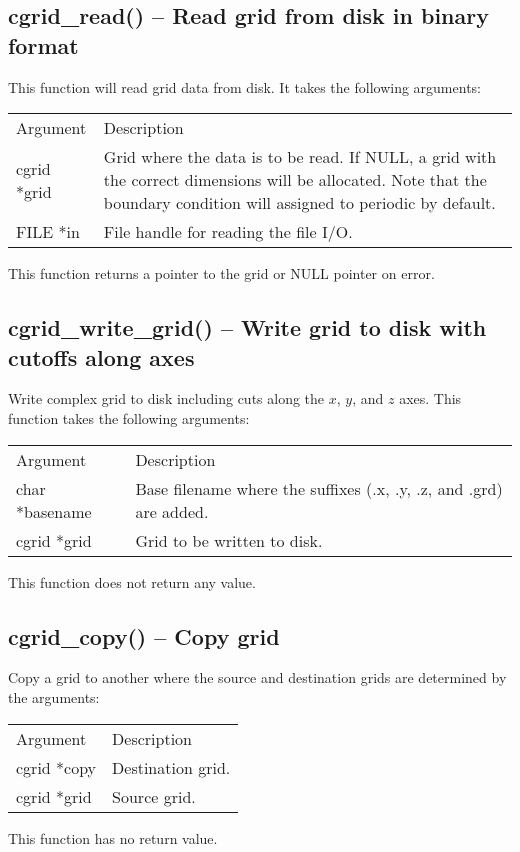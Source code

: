 \documentclass[12pt,letterpaper]{report}
\begin{document}
\subsection{cgrid\_read() -- Read grid from disk in binary format}

This function will read grid data from disk. It takes the following arguments:
\begin{longtable}{p{} p{}}
Argument & Description\\
\cline{1-2}
cgrid *grid & Grid where the data is to be read. If NULL, a grid with the correct dimensions will be allocated. Note that the boundary condition will assigned to periodic by default.\\
FILE *in & File handle for reading the file I/O.\\
\end{longtable}
This function returns a pointer to the grid or NULL pointer on error.

\subsection{cgrid\_write\_grid() -- Write grid to disk with cutoffs along axes}

Write complex grid to disk including cuts along the $x$, $y$, and $z$ axes. This function takes the following arguments:
\begin{longtable}{p{} p{}}
Argument & Description\\
\cline{1-2}
char *basename & Base filename where the suffixes (.x, .y, .z, and .grd) are added.\\
cgrid *grid & Grid to be written to disk.\\
\end{longtable}
\noindent
This function does not return any value.

\subsection{cgrid\_copy() -- Copy grid}

Copy a grid to another where the source and destination grids are determined by the arguments:
\begin{longtable}{p{} p{}}
Argument & Description\\
\cline{1-2}
cgrid *copy & Destination grid.\\
cgrid *grid & Source grid.\\
\end{longtable}
\noindent
This function has no return value.
\end{document}
